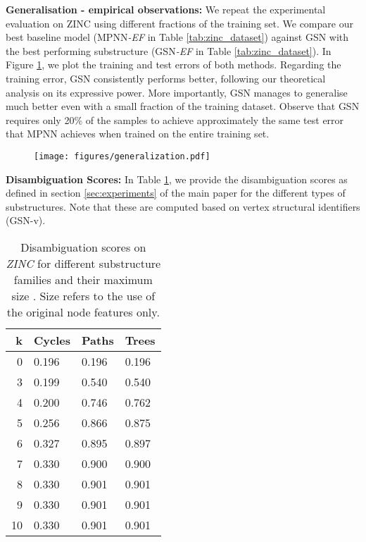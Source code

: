 \documentclass{article} \usepackage{iclr2021_conference,times}
\begin{document}
\noindent\textbf{Generalisation - empirical observations:} We repeat the experimental evaluation on ZINC using different fractions of the training set. We compare our best baseline model (MPNN\textit{-EF} in Table \ref{tab:zinc_dataset}) against GSN with the best performing substructure (GSN\textit{-EF} in Table \ref{tab:zinc_dataset}). In Figure \ref{fig:generalisation}, we plot the training and test errors of both methods. Regarding the training error, GSN consistently performs better, following our theoretical analysis on its expressive power. More importantly, GSN manages to generalise much better even with a small fraction of the training dataset. Observe that GSN requires only 20\% of the samples to achieve approximately the same test error that MPNN achieves when trained on the entire training set.

\begin{figure}[!h]
  \centering
  \texttt{[image: figures/generalization.pdf]}
    \captionsetup[figure]{skip=\abovecaptionskip}
  \label{fig:generalisation}
\end{figure}

\noindent\textbf{Disambiguation Scores:} In Table \ref{tab:uniqueness}, we provide the disambiguation scores  as defined in section \ref{sec:experiments} of the main paper for the different types of substructures. Note that these are computed based on vertex structural identifiers (GSN-v).

\begin{table}[h]
         \centering
\caption{Disambiguation scores  on \textit{ZINC} for different substructure families and their maximum size . Size  refers to the use of the original node features only.}
          \begin{tabular}{r | l | l | l}
k & Cycles & Paths & Trees \\
            \hline
            0 & 0.196 & 0.196 & 0.196\\
            3 & 0.199 & 0.540 & 0.540\\
            4 & 0.200 & 0.746 & 0.762\\
            5 & 0.256 & 0.866 & 0.875\\
            6 & 0.327 & 0.895 & 0.897\\
            7 & 0.330 & 0.900 & 0.900\\
            8 & 0.330 & 0.901 & 0.901\\
            9 & 0.330 & 0.901 & 0.901\\
            10 & 0.330 & 0.901 & 0.901\\
          \end{tabular}\label{tab:uniqueness}
\end{table}
\end{document}

